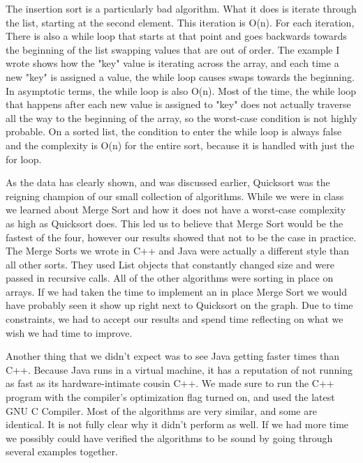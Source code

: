 
The insertion sort is a particularly bad algorithm. What it does is iterate
through the list, starting at the second element. This iteration is O(n). For
each iteration, There is also a while loop that starts at that point and goes
backwards towards the beginning of the list swapping values that are out of
order. The example I wrote shows how the "key" value is iterating across the
array, and each time a new "key" is assigned a value, the while loop causes
swaps towards the beginning. In asymptotic terms, the while loop is also O(n).
Most of the time, the while loop that happens after each new value is assigned
to "key" does not actually traverse all the way to the beginning of the array,
so the worst-case condition is not highly probable. On a sorted list, the
condition to enter the while loop is always false and the complexity is O(n) for
the entire sort, because it is handled with just the for loop.

As the data has clearly shown, and was discussed earlier, Quicksort was the
reigning champion of our small collection of algorithms. While we were in class
we learned about Merge Sort and how it does not have a worst-case complexity as
high as Quicksort does. This led us to believe that Merge Sort would be the
fastest of the four, however our results showed that not to be the case in
practice. The Merge Sorts we wrote in C++ and Java were actually a different
style than all other sorts. They used List objects that constantly changed size
and were passed in recursive calls. All of the other algorithms were sorting in
place on arrays. If we had taken the time to implement an in place Merge Sort we
would have probably seen it show up right next to Quicksort on the graph. Due to
time constraints, we had to accept our results and spend time reflecting on what
we wish we had time to improve.

Another thing that we didn't expect was to see Java getting faster times than
C++. Because Java runs in a virtual machine, it has a reputation of not running
as fast as its hardware-intimate cousin C++. We made sure to run the C++ program
with the compiler's optimization flag turned on, and used the latest GNU C
Compiler. Most of the algorithms are very similar, and some are identical. It is
not fully clear why it didn't perform as well. If we had more time we possibly
could have verified the algorithms to be sound by going through several
examples together.

